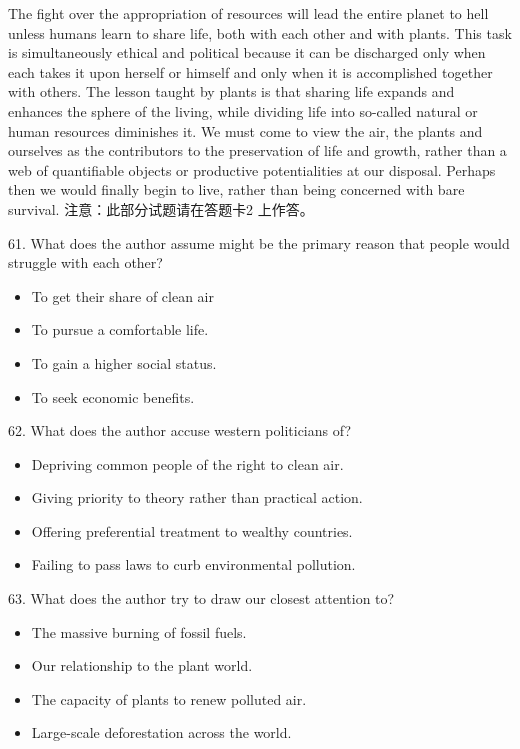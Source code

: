 \documentclass[UTF8,11pt]{ctexart}
\begin{document}
The fight over the appropriation of resources will lead the entire planet to hell unless humans learn to share life, both with each other and with plants. This task is simultaneously ethical and political because it can be discharged only when each takes it upon herself or himself and only when it is accomplished together with others. The lesson taught by plants is that sharing life expands and enhances the sphere of the living, while dividing life into so-called natural or human resources diminishes it. We must come to view the air, the plants and ourselves as the contributors to the preservation of life and growth, rather than a web of quantifiable objects or productive potentialities at our disposal. Perhaps then we would finally begin to live, rather than being concerned with bare survival. 注意：此部分试题请在答题卡2 上作答。


61. What does the author assume might be the primary reason that people would struggle with each other?


\begin{itemize}[leftmargin=2em,itemsep=.2em,topsep=.4em]\item[A.] To get their share of clean air
\item[B.] To pursue a comfortable life.
\item[C.] To gain a higher social status.
\item[D.] To seek economic benefits.
\end{itemize}

62. What does the author accuse western politicians of?


\begin{itemize}[leftmargin=2em,itemsep=.2em,topsep=.4em]\item[A.] Depriving common people of the right to clean air.
\item[B.] Giving priority to theory rather than practical action.
\item[C.] Offering preferential treatment to wealthy countries.
\item[D.] Failing to pass laws to curb environmental pollution.
\end{itemize}

63. What does the author try to draw our closest attention to?


\begin{itemize}[leftmargin=2em,itemsep=.2em,topsep=.4em]\item[A.] The massive burning of fossil fuels.
\item[B.] Our relationship to the plant world.
\item[C.] The capacity of plants to renew polluted air.
\item[D.] Large-scale deforestation across the world.
\end{itemize}
\end{document}

